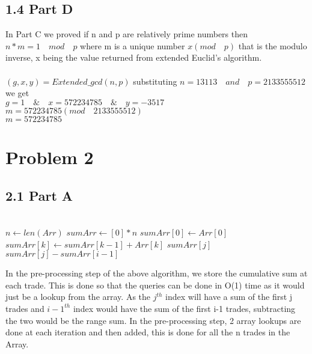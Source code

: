 \documentclass[12pt]{article}
\begin{document}
\subsection*{1.4 Part D}
\vspace{10pt}

In Part C we proved if n and p are relatively prime numbers then \(n*m=1 \quad mod \quad p\) where m is a unique number \(x (mod \quad p)\) that is the modulo inverse, x being the value returned from extended Euclid's algorithm. 
\\ \\
\((g, x, y)=Extended\_gcd(n, p)\) substituting \(n=13113 \quad and \quad p=2133555512\) we get \\
\(g=1 \quad \& \quad x=572234785 \quad \& \quad y=-3517\) \\
\(m=572234785 ( mod \quad 2133555512)\) \\
\(m=572234785\)

\section*{Problem 2}


\subsection*{2.1 Part A}
\vspace{10pt}

\begin{algorithmic}
 \\
\State $n \gets len(Arr)$ \quad {}
\State $sumArr \gets [0]*n$
\State $sumArr[0] \gets Arr[0]$
 \quad {}
\State $sumArr[k] \gets sumArr[k-1]+Arr[k]$
\EndFor
{} 
\Return $sumArr[j]$
\EndIf
\Return $sumArr[j]-sumArr[i-1]$ \quad {}
\EndProcedure
\end{algorithmic}

In the pre-processing step of the above algorithm, we store the cumulative sum at each trade. This is done so that the queries can be done in O(1) time as it would just be a lookup from the array. As the $j^{th}$ index will have a sum of the first j trades and $i-1^{th}$ index would have the sum of the first i-1 trades, subtracting the two would be the range sum. In the pre-processing step, 2 array lookups are done at each iteration and then added, this is done for all the n trades in the Array.  
\end{document}
